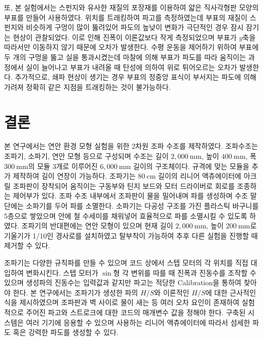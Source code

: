 


또, 본 실험에서는 스펀지와 유사한 재질의 포장재를 이용하여 얇은 직사각형판 모양의 부표를 만들어 사용하였다. 위치를 트래킹하여 파고를 측정하였는데 부표의 재질이 스펀지와 비슷하게 구멍이 많이 뚫려있어 파도의 높낮이 변화가 극단적인 경우 잠시 잠기는 현상이 관찰되었다. 이로 인해 진폭이 이론값보다 작게 측정되었으며 부표가 $y$축을 따라서만 이동하지 않기 때문에 오차가 발생한다. 수평 운동을 제어하기 위하여 부표에 두 개의 구멍을 뚫고 실을 통과시켰는데 마찰에 의해 부표가 파도를 따라 움직이는 과정에서 실이 늘어나고 부표가 내려올 때 탄성에 의하여 위로 튀어오르는 오차가 발생한다. 추가적으로, 쇄파 현상이 생기는 경우 부표의 정중앙 표식이 부서지는 파도에 의해 가려져 정확히 같은 지점을 트래킹하는 것이 불가능하다.


\section{결론}

본 연구에서는 연안 환경 모형 실험을 위한 2차원 조파 수조를 제작하였다. 조파수조는 조파기, 소파기, 연안 모형 등으로 구성되며 수조는 길이 $2,000~\mathrm{mm}$, 높이 $400~\mathrm{mm}$, 폭 $300~\mathrm{mm}$의 모듈 3개로 이루어진 $6,000~\mathrm{mm}$ 길이의 구조체이다. 규격에 맞는 모듈을 추가 제작하여 길이 연장이 가능하다. 조파기는 $80~\mathrm{cm}$ 길이의 리니어 액츄에이터에 아크릴 조파판이 장착되어 움직이는 구동부와 틴지 보드와 모터 드라이버로 회로를 조종하는 제어부가 있다. 조파 수조 내부에서 조파판이 물을 밀어내며 파를 생성하며 수조 말단에는 소파기를 두어 파를 소멸한다. 소파기는 다공성 구조를 가진 플라스틱 바구니를 5층으로 쌓았으며 안에 철 수세미를 채워넣어 효율적으로 파를 소멸시킬 수 있도록 하였다. 조파기의 반대편에는 연안 모형이 있으며 현재 길이 $2,000~\mathrm{mm}$, 높이 $200~\mathrm{mm}$로 기울기가 1/10인 경사로를 설치하였고 탈부착이 가능하여 추후 다른 실험을 진행할 때 제거할 수 있다.

조파기는 다양한 규칙파를 만들 수 있으며 코드 상에서 스텝 모터의 각 위치를 직접 대입하여 변화시킨다. 스텝 모터가 $\sin$형 각 변위를 따를 때 진폭과 진동수를 조작할 수 있으며 생성파의 진동수는 입력값과 같지만 파고는 적당한 Calibration을 통하여 찾아야 한다. 본 연구에서는 조파기가 생성한 파의 $H/S$와 이론적인 $H/S$에 대한 근사적인 식을 제시하였으며 조파판과 벽 사이로 물이 새는 등 여러 오차 요인이 존재하여 실험적으로 주어진 파고와 스트로크에 대한 코드의 매개변수 값을 정해야 한다. 구축된 시스템은 여러 기기에 응용할 수 있으며 사용하는 리니어 액츄에이터에 따라서 섬세한 파도 혹은 강력한 파도를 생성할 수 있다.

